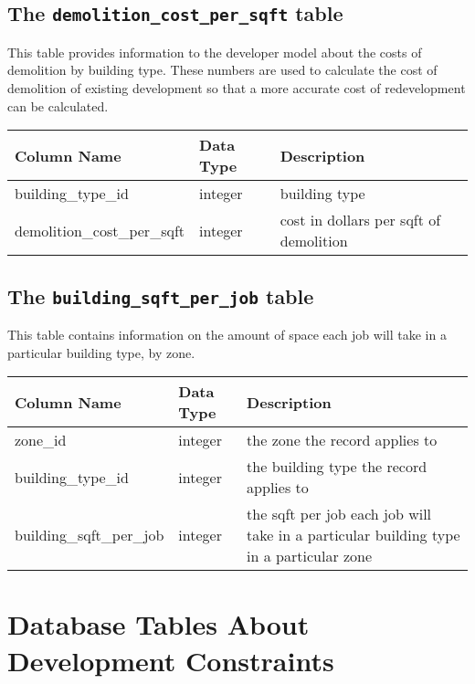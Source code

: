 \subsection{The {\tt demolition\_cost\_per\_sqft} table}
\label{sec:db-tables-demolition-cost-per-sqft}

This table provides information to the developer model about the costs of demolition by building type. These numbers are used to calculate the cost of demolition of existing development so that a more accurate cost of redevelopment can be calculated.

\begin{tabular}{p{2.3in}lp{3.2in}}
\textbf{Column Name} & \textbf{Data Type} & \textbf{Description} \\
\hline
building\_type\_id & integer & building type\\ \hline
demolition\_cost\_per\_sqft & integer & cost in dollars per sqft of demolition\\ \hline 
\end{tabular}


\subsection{The {\tt building\_sqft\_per\_job} table}
\label{sec:db-tables-building-sqft-per-job}

This table contains information on the amount of space each job will take in a particular building type, by zone.

\begin{tabular}{p{2.3in}lp{3.2in}}
\textbf{Column Name} & \textbf{Data Type} & \textbf{Description} \\
\hline
zone\_id & integer & the zone the record applies to\\ \hline
building\_type\_id & integer & the building type the record applies to\\ \hline
building\_sqft\_per\_job & integer & the sqft per job each job will take in a particular building type in a particular zone \\ \hline
\end{tabular}

\section{Database Tables About Development Constraints}

